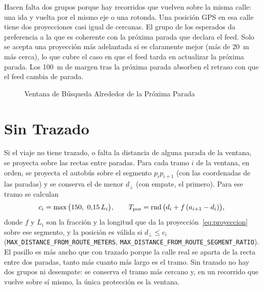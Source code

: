 Hacen falta dos grupos porque hay recorridos que vuelven sobre la misma calle: una ida y vuelta por el mismo eje o
una rotonda. Una posición GPS en esa calle tiene dos proyecciones casi igual de cercanas. El grupo de los esperados da
preferencia a la que es coherente con la próxima parada que declara el feed. Solo se acepta una proyección más
adelantada si es claramente mejor (más de 20~m más cerca), lo que cubre el caso en que el feed tarda en actualizar la
próxima parada. Los 100~m de margen tras la próxima parada absorben el retraso con que el feed cambia de parada.

\begin{figure}[ht]
\centering
\caption{Ventana de Búsqueda Alrededor de la Próxima Parada}\label{fig:ventana}
\end{figure}

\section{Sin Trazado}
\label{sec:sin-trazado}

Si el viaje no tiene trazado, o falta la distancia de alguna parada de la ventana, se proyecta sobre las rectas entre
paradas. Para cada tramo $i$ de la ventana, en orden, se proyecta el autobús sobre el segmento $p_ip_{i+1}$ (con las
coordenadas de las paradas) y se conserva el de menor $d_\perp$ (con empate, el primero). Para ese tramo se calculan
\begin{equation}
c_i=\max\big(150,\ 0{,}15\,L_i\big),\qquad T_{\mathrm{pos}}=\operatorname{rnd}\big(d_i+f\,(a_{i+1}-d_i)\big),
\end{equation}
donde $f$ y $L_i$ son la fracción y la longitud que da la proyección~\eqref{eq:proyeccion} sobre ese segmento, y la
posición es válida si $d_\perp\le c_i$ (\texttt{MAX\_DISTANCE\_FROM\_ROUTE\_METERS},
\texttt{MAX\_DISTANCE\_FROM\_ROUTE\_SEGMENT\_RATIO}). El pasillo es más ancho que con trazado porque la calle real se
aparta de la recta entre dos paradas, tanto más cuanto más largo es el tramo. Sin trazado no hay dos grupos ni
desempate: se conserva el tramo más cercano y, en un recorrido que vuelve sobre sí mismo, la única protección es la
ventana.

